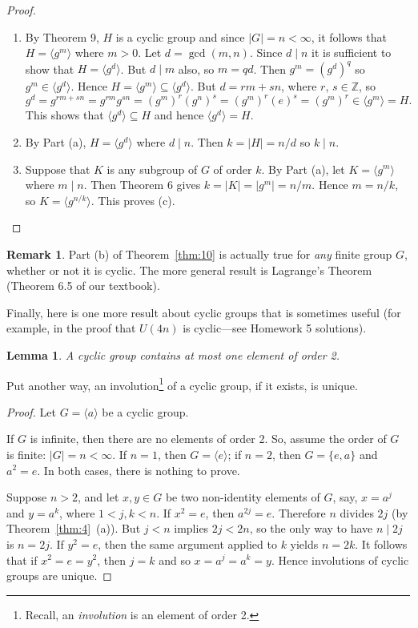 \documentclass[12pt]{article}
\newcommand{\Z} {{\mathbb Z}}
\newcommand{\divides}{\ensuremath{\mid}}
\newcommand{\<}{\ensuremath{\langle}}
\renewcommand{\>}{\ensuremath{\rangle}}
\newcommand{\eye}{\ensuremath{e}}
\theoremstyle{plain}
\newtheorem{lem}[thm]{Lemma}
\theoremstyle{definition}
\newtheorem{rem}[thm]{Remark}
\begin{document}
\begin{proof} \begin{enumerate}
\item By Theorem 9, $H$ is a cyclic group and since $|G|=n<\infty$,
it follows that $H=\langle g^m\rangle$ where $m>0$.  Let
$d=\gcd(m, n)$.  Since $d\divides n$ it is sufficient to show that
$H=\langle g^d\rangle$.  But $d\divides m$ also, so $m=qd$.  Then
$g^m=(g^d)^q$ so $g^m\in \langle g^d\rangle$.  Hence $H=\langle
g^m\rangle \subseteq \langle g^d\rangle$.  But $d=rm+ sn$, where
$r$, $s\in \Z$, so
$$g^d=g^{rm+sn}=g^{rm}g^{sn}=(g^m)^r(g^n)^s=(g^m)^r(\eye)^s=
(g^m)^r\in\langle g^m\rangle = H.$$
This shows that $\langle g^d \rangle \subseteq H$ and  hence
$\langle g^d\rangle = H$.

\item By Part (a), $H=\langle g^d\rangle$ where $d\divides n$.  Then $k=|H|=
n/d$ so $k\divides n$.

\item Suppose that $K$ is any subgroup of $G$ of order $k$.  By
Part (a), let $K=\langle g^m\rangle$ where $m\divides n$.  Then
Theorem 6 gives $k=|K| = |g^m| = n/m$.  Hence $m=n/k$, so
$K=\langle g^{n/k}\rangle$.  This proves (c).
\end{enumerate}
\end{proof}

\begin{rem} Part (b) of Theorem~\ref{thm:10} is actually true for {\it any} finite
group $G$, whether or not it is cyclic.  The more general result is Lagrange's
Theorem (Theorem 6.5 of our textbook).
\end{rem}


Finally, here is one more result about cyclic groups that is sometimes
useful (for example, in the proof that $U(4n)$ is cyclic---see Homework 5
solutions).
\begin{lem}
A cyclic group contains at most one element of order 2.  
\end{lem}
\noindent Put another way, an involution\footnote{Recall, an \emph{involution} is an element
  of order 2.} of a cyclic group, if it exists, is unique.
\begin{proof}
Let $G = \<a \>$ be a cyclic group.

If $G$ is infinite, then there are no elements of order 2.
So, assume the order of $G$ is finite: $|G| = n < \infty$.
If $n=1$, then $G = \<e\>$; if $n=2$, then $G = \{e, a\}$ and $a^2 = e$.
In both cases, there is nothing to prove.

Suppose $n>2$, and let $x, y \in G$ be two non-identity elements of $G$, say, 
$x = a^j$ and $y = a^k$, where $1< j, k < n$. If $x^2 = e$, then $a^{2j}=e$.  
Therefore $n$ divides $2j$ (by Theorem~\ref{thm:4}~(a)).
But $j < n$ implies $2j<2n$, so the only way to have $n\divides 2j$ is
$n=2j$. If $y^2 = e$, then the same argument applied to $k$ yields $n=2k$.
It follows that if $x^2 = e = y^2$, then $j=k$ and so $x = a^{j}=a^k = y$. 
Hence involutions of cyclic groups are unique.   
\end{proof}
\end{document}
